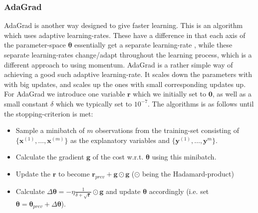 \documentclass{article}
\begin{document}
\subsubsection{AdaGrad}
\label{adagradsec}
AdaGrad is another way designed to give faster learning. This is an algorithm
which uses adaptive learning-rates. These have a difference in that each axis of
the parameter-space $\bm{\theta}$ essentially get a separate learning-rate
\cite[s.~8.5]{goodfellow2016deep}, while these separate learning-rates change/adapt
throughout the learning process, which is a different approach to using momentum.
AdaGrad is a rather simple way of achieving a good such adaptive learning-rate.
It scales down the parameters with with big updates, and scales up the ones with
small corresponding updates up. For AdaGrad we introduce one variable $\bm{r}$
which we initially set to $\bm{0}$, as well as a small constant $\delta$ which
we typically set to $10^{-7}$. The algorithms is as follows until the
stopping-criterion is met:
\begin{itemize}
      \item Sample a minibatch of $m$ observations from the training-set
            consisting of $\{\bm{x}^{(1)}, \dots, \bm{x}^{(m)}\}$ as the explanatory
            variables and $\{\bm{y}^{(1)}, \dots, \bm{y}^{m}\}$.
      \item Calculate the gradient $\bm{g}$ of the cost w.r.t. $\bm{\theta}$ using
            this minibatch.
      \item Update the $\bm{r}$ to become $\bm{r}_{prev} + \bm{g} \odot \bm{g}$
            ($\odot$ being the Hadamard-product)
      \item Calculate $\Delta \bm{\theta} = -\eta
                  \frac{1}{\delta + \sqrt{\bm{r}}} \odot \bm{g}$ and update
            $\bm{\theta}$ accordingly (i.e. set $\bm{\theta} =
                  \bm{\theta}_{prev} + \Delta \bm{\theta}$).

\end{itemize}
\end{document}
